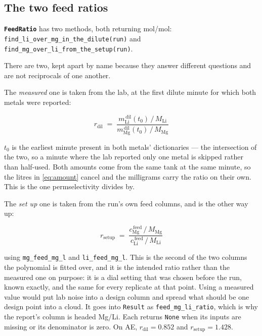 \subsection{The two feed ratios}

\textbf{\texttt{FeedRatio}} has two methods, both returning mol/mol:
\texttt{find\_li\_over\_mg\_in\_the\_dilute(run)} and
\texttt{find\_mg\_over\_li\_from\_the\_setup(run)}.

There are two, kept apart by name because they answer different questions and are not
reciprocals of one another.

The \emph{measured} one is taken from the lab, at the first dilute minute for which both metals
were reported:

\begin{equation}
  r_\mathrm{dil} \;=\;
  \frac{m_\mathrm{Li}^{\,\mathrm{dil}}(t_0)\,/\,M_\mathrm{Li}}
       {m_\mathrm{Mg}^{\,\mathrm{dil}}(t_0)\,/\,M_\mathrm{Mg}}
  \label{eq:feed-measured}
\end{equation}

$t_0$ is the earliest minute present in both metals' dictionaries --- the intersection of the
two, so a minute where the lab reported only one metal is skipped rather than half-used. Both
amounts come from the same tank at the same minute, so the litres in \eqref{eq:amount} cancel and
the milligrams carry the ratio on their own. This is the one permselectivity divides by.

The \emph{set up} one is taken from the run's own feed columns, and is the other way up:

\begin{equation}
  r_\mathrm{setup} \;=\;
  \frac{c_\mathrm{Mg}^{\,\mathrm{feed}}\,/\,M_\mathrm{Mg}}
       {c_\mathrm{Li}^{\,\mathrm{feed}}\,/\,M_\mathrm{Li}}
  \label{eq:feed-setup}
\end{equation}

using \texttt{mg\_feed\_mg\_l} and \texttt{li\_feed\_mg\_l}. This is the second of the two
columns the polynomial is fitted over, and it is the intended ratio rather than the measured one
on purpose: it is a dial setting that was chosen before the run, known exactly, and the same for
every replicate at that point. Using a measured value would put lab noise into a design column
and spread what should be one design point into a cloud. It goes into \texttt{Result} as
\texttt{feed\_mg\_li\_ratio}, which is why the report's column is headed Mg/Li. Each returns
\texttt{None} when its inputs are missing or its denominator is zero. On AE,
$r_\mathrm{dil} = 0.852$ and $r_\mathrm{setup} = 1.428$.

